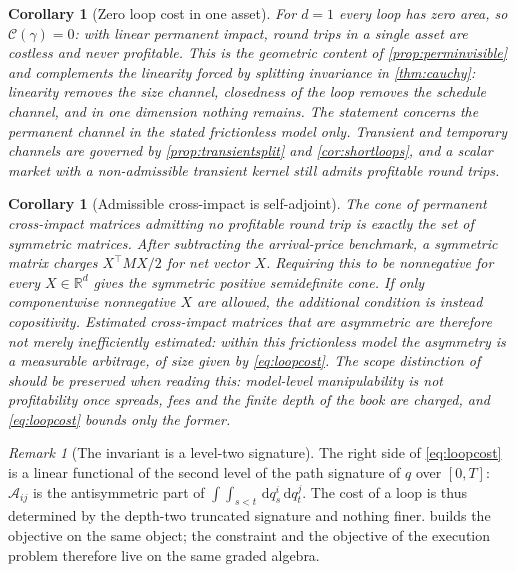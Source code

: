\documentclass[11pt]{article}
\numberwithin{equation}{section}
\newtheorem{corollary}[theorem]{Corollary}
\theoremstyle{definition}
\theoremstyle{remark}
\newtheorem{remark}[theorem]{Remark}
\newcommand{\R}{\mathbb{R}}
\theoremstyle{definition}
\newcommand{\dd}{\,\mathrm d}
\begin{document}
\begin{corollary}[Zero loop cost in one asset]\label{cor:oneasset}
For $d=1$ every loop has zero area, so $\mathcal C(\gamma)=0$: with linear
permanent impact, round trips in a single asset are costless and never
profitable. This is the geometric content of \cref{prop:perminvisible} and
complements the linearity forced by splitting invariance in
\cref{thm:cauchy}: linearity removes the size channel, closedness of the loop
removes the schedule channel, and in one dimension nothing remains.
The statement concerns the permanent channel in the stated frictionless model
only. Transient and temporary channels are governed by
\cref{prop:transientsplit} and \cref{cor:shortloops}, and a scalar market
with a non-admissible transient kernel still admits profitable round trips.
\end{corollary}

\begin{corollary}[Admissible cross-impact is self-adjoint]\label{cor:selfadjoint}
The cone of permanent cross-impact matrices admitting no profitable round trip
is exactly the set of symmetric matrices. After subtracting the arrival-price
benchmark, a symmetric matrix charges $X^\top MX/2$ for net vector $X$.
Requiring this to be nonnegative for every $X\in\R^d$ gives the symmetric
positive semidefinite cone. If only componentwise nonnegative $X$ are allowed,
the additional condition is instead copositivity. Estimated cross-impact matrices that are asymmetric are
therefore not merely inefficiently estimated: within this frictionless model the
asymmetry is a measurable arbitrage, of size given by \eqref{eq:loopcost}. The
scope distinction of \citet{schneider2019} should be preserved when reading
this: model-level manipulability is not profitability once spreads, fees and
the finite depth of the book are charged, and \eqref{eq:loopcost} bounds only
the former.
\end{corollary}

\begin{remark}[The invariant is a level-two signature]\label{rem:level2}
The right side of \eqref{eq:loopcost} is a linear functional of the second level
of the path signature of $q$ over $[0,T]$: $\mathcal A_{ij}$ is the
antisymmetric part of $\int\int_{s<t}\dd q^i_s\dd q^j_t$. The cost of a loop is
thus determined by the depth-two truncated signature and nothing finer.
 builds the objective on the same object; the constraint and
the objective of the execution problem therefore live on the same graded
algebra.
\end{remark}
\end{document}
